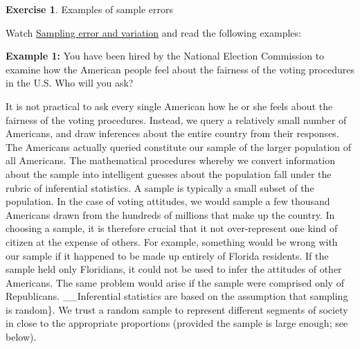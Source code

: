 \documentclass[
  12pt,
  oneside]{book}
\theoremstyle{definition}
\theoremstyle{definition}
\theoremstyle{definition}
\newtheorem{exercise}{Exercise}[chapter]
\theoremstyle{definition}
\theoremstyle{remark}
\begin{document}
\begin{exercise}
\protect\hypertarget{exr:examplesampleerror}{}\label{exr:examplesampleerror}Examples of sample errors

Watch \href{https://creativemaths.net/videos/video-variation-sources}{Sampling error and variation} and read the following examples:

\textbf{Example 1:} You have been hired by the National Election Commission to
examine how the American people feel about the fairness of the voting procedures in the U.S. Who will you ask?

It is not practical to ask every single American how he or she feels about the
fairness of the voting procedures. Instead, we query a relatively small number of
Americans, and draw inferences about the entire country from their responses. The
Americans actually queried constitute our sample of the larger population of all
Americans. The mathematical procedures whereby we convert information about
the sample into intelligent guesses about the population fall under the rubric of
inferential statistics.
A sample is typically a small subset of the population. In the case of voting
attitudes, we would sample a few thousand Americans drawn from the hundreds of
millions that make up the country. In choosing a sample, it is therefore crucial that
it not over-represent one kind of citizen at the expense of others. For example,
something would be wrong with our sample if it happened to be made up entirely
of Florida residents. If the sample held only Floridians, it could not be used to infer
the attitudes of other Americans. The same problem would arise if the sample were
comprised only of Republicans. \_\_Inferential statistics are based on the assumption
that sampling is random\}. We trust a random sample to represent different segments
of society in close to the appropriate proportions (provided the sample is large
enough; see below).


\end{exercise}
\end{document}
